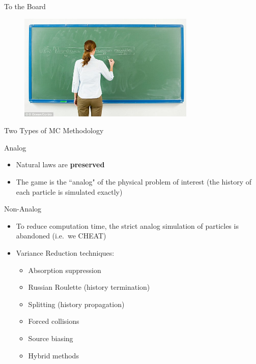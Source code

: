 \documentclass[xcolor=x11names,compress]{beamer}
\renewcommand{\(}{\begin{columns}}
\renewcommand{\)}{\end{columns}}
\newcommand{\<}[1]{\begin{column}{#1}}
\renewcommand{\>}{\end{column}}
\begin{document}
\begin{frame}{To the Board}

  	\begin{figure}
  	\begin{center}
  		\includegraphics[height=2in,clip]{../figs/board}
	\end{center}
  	\end{figure}

\end{frame}


\begin{frame}{Two Types of MC Methodology}

\alert{Analog}
\begin{itemize}
    \item Natural laws are \textbf{preserved}
    \item The game is the ``analog" of the physical problem of interest (the history of each particle is simulated exactly)
\end{itemize}
\pause

\alert{Non-Analog}
\begin{itemize}
    \item To reduce computation time, the strict analog simulation of particles is abandoned (i.e.\ we CHEAT)
    \item Variance Reduction techniques:
    \begin{itemize}
    \item Absorption suppression
    \item Russian Roulette (history termination)
    \item Splitting (history propagation)
    \item Forced collisions
    \item Source biasing
    \item Hybrid methods
    \end{itemize}
    \end{itemize}

\end{frame}
\end{document}
